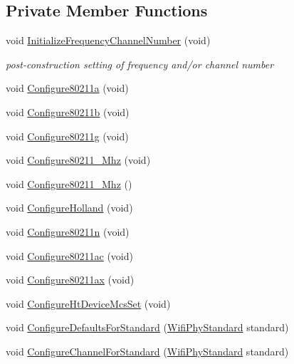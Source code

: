 \subsection*{Private Member Functions}
\begin{DoxyCompactItemize}
\item 
void \hyperlink{classns3_1_1WifiPhy_a6f926737f6ba77c4b619734f396ed3ed}{Initialize\+Frequency\+Channel\+Number} (void)
\begin{DoxyCompactList}\small\item\em post-\/construction setting of frequency and/or channel number \end{DoxyCompactList}\item 
void \hyperlink{classns3_1_1WifiPhy_a3f4c48226fee10de85a17e6ce62af0f3}{Configure80211a} (void)
\item 
void \hyperlink{classns3_1_1WifiPhy_a6d06ede65c6956ad9c414a00587279d7}{Configure80211b} (void)
\item 
void \hyperlink{classns3_1_1WifiPhy_a71286ced86fbd1b11c4b68e053b3e8d0}{Configure80211g} (void)
\item 
void \hyperlink{classns3_1_1WifiPhy_a42b42da70fb83cc0136c78658698c620}{Configure80211\+\_\+Mhz} (void)
\item 
void \hyperlink{classns3_1_1WifiPhy_a7f3076e93e88d1c884dde3e390fa9756}{Configure80211\+\_\+Mhz} ()
\item 
void \hyperlink{classns3_1_1WifiPhy_aba0f3d79d7fe9be1485a3d87a8923cdd}{Configure\+Holland} (void)
\item 
void \hyperlink{classns3_1_1WifiPhy_ac4cf51f397334a060632d690675446e6}{Configure80211n} (void)
\item 
void \hyperlink{classns3_1_1WifiPhy_a9023b105175409e6dde1281cc6584cf3}{Configure80211ac} (void)
\item 
void \hyperlink{classns3_1_1WifiPhy_adcda370490dc230a5c737c7a83de9bcd}{Configure80211ax} (void)
\item 
void \hyperlink{classns3_1_1WifiPhy_a7cd2773f895166ffcfa811efe120e1f0}{Configure\+Ht\+Device\+Mcs\+Set} (void)
\item 
void \hyperlink{classns3_1_1WifiPhy_ae5a54012ac4703d86299312251c41114}{Configure\+Defaults\+For\+Standard} (\hyperlink{group__wifi_ga1299834f4e1c615af3ca738033b76a49}{Wifi\+Phy\+Standard} standard)
\item 
void \hyperlink{classns3_1_1WifiPhy_aed528417ac25eecc7ecf44079d162847}{Configure\+Channel\+For\+Standard} (\hyperlink{group__wifi_ga1299834f4e1c615af3ca738033b76a49}{Wifi\+Phy\+Standard} standard)

\end{DoxyCompactItemize}
